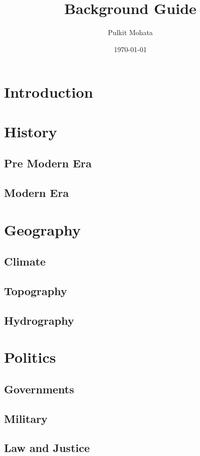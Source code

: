 \documentclass[11pt]{article}
\author{Pulkit Mohata}
\date{\today}
\title{Background Guide}
\begin{document}
\maketitle
\tableofcontents

\section{Introduction}
\label{sec:org875150f}
\section{History}
\label{sec:org9b4307f}
\subsection{Pre Modern Era}
\label{sec:org12300a5}
\subsection{Modern Era}
\label{sec:org71db4fc}
\section{Geography}
\label{sec:orge100106}
\subsection{Climate}
\label{sec:org27336ad}
\subsection{Topography}
\label{sec:org2736a9c}
\subsection{Hydrography}
\label{sec:org87a22c0}
\section{Politics}
\label{sec:org142a14c}
\subsection{Governments}
\label{sec:orgf585d61}
\subsection{Military}
\label{sec:org2d56a5c}
\subsection{Law and Justice}
\label{sec:org1aff790}
\end{document}
